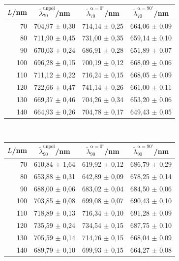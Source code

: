 \begin{center}
    \captionsetup{type = table}
    \begin{tabular}{r | c c c}
        $L$/nm & $\tilde{\lambda}^\mathrm{unpol}_{70}$/nm & $\tilde{\lambda}^\mathrm{\alpha = 0^\circ}_{70}$/nm & $\tilde{\lambda}^\mathrm{\alpha = 90^\circ}_{70}$/nm \\\hline
        70  & 704,97 $\pm$ 0,30 & 714,14 $\pm$ 0,25 & 664,06 $\pm$ 0,09 \\
        80  & 711,90 $\pm$ 0,45 & 731,00 $\pm$ 0,35 & 659,14 $\pm$ 0,10 \\
        90  & 670,03 $\pm$ 0,24 & 686,91 $\pm$ 0,28 & 651,89 $\pm$ 0,07 \\
        100 & 696,28 $\pm$ 0,15 & 700,19 $\pm$ 0,12 & 668,09 $\pm$ 0,06 \\
        110 & 711,12 $\pm$ 0,22 & 716,24 $\pm$ 0,15 & 668,05 $\pm$ 0,09 \\
        120 & 722,66 $\pm$ 0,47 & 741,14 $\pm$ 0,26 & 661,00 $\pm$ 0,11 \\
        130 & 669,37 $\pm$ 0,46 & 704,26 $\pm$ 0,34 & 653,20 $\pm$ 0,06 \\
        140 & 664,93 $\pm$ 0,26 & 704,78 $\pm$ 0,17 & 649,43 $\pm$ 0,05 \\
    \end{tabular}\\[0.5cm]
    \begin{tabular}{r | c c c}
        $L$/nm & $\tilde{\lambda}^\mathrm{unpol}_{90}$/nm & $\tilde{\lambda}^\mathrm{\alpha = 0^\circ}_{90}$/nm & $\tilde{\lambda}^\mathrm{\alpha = 90^\circ}_{90}$/nm \\\hline
        70  & 610,84 $\pm$ 1,64 & 619,92 $\pm$ 0,12 & 686,79 $\pm$ 0,29 \\
        80  & 653,88 $\pm$ 0,31 & 642,89 $\pm$ 0,09 & 678,25 $\pm$ 0,14 \\
        90  & 688,00 $\pm$ 0,06 & 683,02 $\pm$ 0,04 & 684,50 $\pm$ 0,06 \\
        100 & 703,85 $\pm$ 0,08 & 699,08 $\pm$ 0,07 & 690,43 $\pm$ 0,10 \\
        110 & 718,89 $\pm$ 0,13 & 716,34 $\pm$ 0,10 & 691,28 $\pm$ 0,09 \\
        120 & 735,59 $\pm$ 0,24 & 734,54 $\pm$ 0,15 & 687,75 $\pm$ 0,10 \\
        130 & 705,59 $\pm$ 0,14 & 714,76 $\pm$ 0,15 & 668,04 $\pm$ 0,09 \\
        140 & 689,79 $\pm$ 0,10 & 699,93 $\pm$ 0,15 & 664,27 $\pm$ 0,08 \\
    \end{tabular}
    \label{tab:nanorods}
\end{center}


